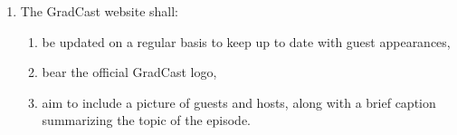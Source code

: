 \begin{enumerate} [label*=\arabic*., align=left]
\begin{enumerate}[label*=\arabic*., align=left]
campus, the general community
\item maintain episodes at approximately 30 minutes in length on a weekly basis or as
designated by CHRW
\item maintain at least one (1) pre-recorded podcast episode to maintain a weekly schedule
as needed should circumstance arise.
\item be comprised of at least one (1) student guest per episode.
\end{enumerate}
\item The GradCast website shall:
\begin{enumerate}[label*=\arabic*., align=left]	
\item be updated on a regular basis to keep up to date with guest appearances,
\item bear the official GradCast logo,
\item aim to include a picture of guests and hosts, along with a brief caption summarizing the topic
of the episode.
\end{enumerate}
\end{enumerate}